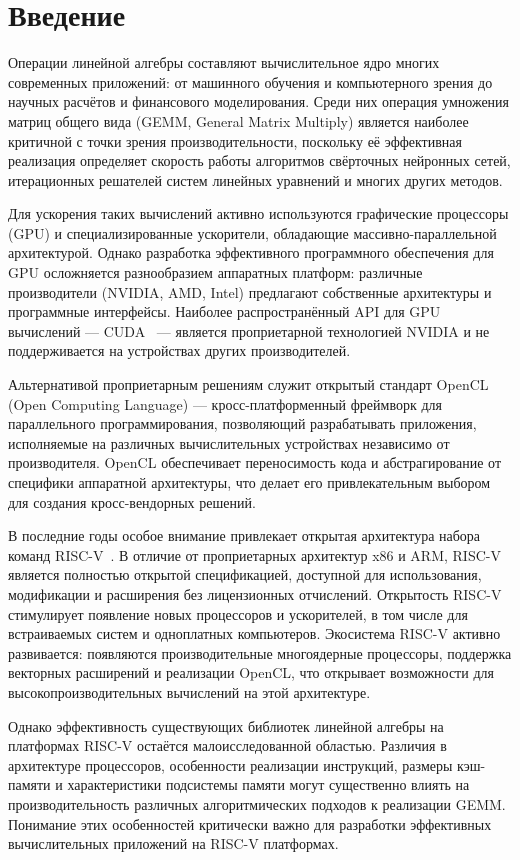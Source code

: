 
\section*{Введение}
\thispagestyle{withCompileDate}

Операции линейной алгебры составляют вычислительное ядро многих современных приложений: от машинного обучения и компьютерного зрения до научных расчётов и финансового моделирования. Среди них операция умножения матриц общего вида (GEMM, General Matrix Multiply) является наиболее критичной с точки зрения производительности, поскольку её эффективная реализация определяет скорость работы алгоритмов свёрточных нейронных сетей, итерационных решателей систем линейных уравнений и многих других методов.

Для ускорения таких вычислений активно используются графические процессоры (GPU) и специализированные ускорители, обладающие массивно-параллельной архитектурой. Однако разработка эффективного программного обеспечения для GPU осложняется разнообразием аппаратных платформ: различные производители (NVIDIA, AMD, Intel) предлагают собственные архитектуры и программные интерфейсы. Наиболее распространённый API для GPU вычислений --- CUDA~\cite{nickolls2008cuda} --- является проприетарной технологией NVIDIA и не поддерживается на устройствах других производителей.

Альтернативой проприетарным решениям служит открытый стандарт OpenCL~\cite{opencl_spec} (Open Computing Language) --- кросс-платформенный фреймворк для параллельного программирования, позволяющий разрабатывать приложения, исполняемые на различных вычислительных устройствах независимо от производителя. OpenCL обеспечивает переносимость кода и абстрагирование от специфики аппаратной архитектуры, что делает его привлекательным выбором для создания кросс-вендорных решений.

В последние годы особое внимание привлекает открытая архитектура набора команд RISC-V~\cite{waterman2014risc}. В отличие от проприетарных архитектур x86 и ARM, RISC-V является полностью открытой спецификацией, доступной для использования, модификации и расширения без лицензионных отчислений. Открытость RISC-V стимулирует появление новых процессоров и ускорителей, в том числе для встраиваемых систем и одноплатных компьютеров. Экосистема RISC-V активно развивается: появляются производительные многоядерные процессоры, поддержка векторных расширений и реализации OpenCL, что открывает возможности для высокопроизводительных вычислений на этой архитектуре.

Однако эффективность существующих библиотек линейной алгебры на платформах RISC-V остаётся малоисследованной областью. Различия в архитектуре процессоров, особенности реализации инструкций, размеры кэш-памяти и характеристики подсистемы памяти могут существенно влиять на производительность различных алгоритмических подходов к реализации GEMM. Понимание этих особенностей критически важно для разработки эффективных вычислительных приложений на RISC-V платформах.